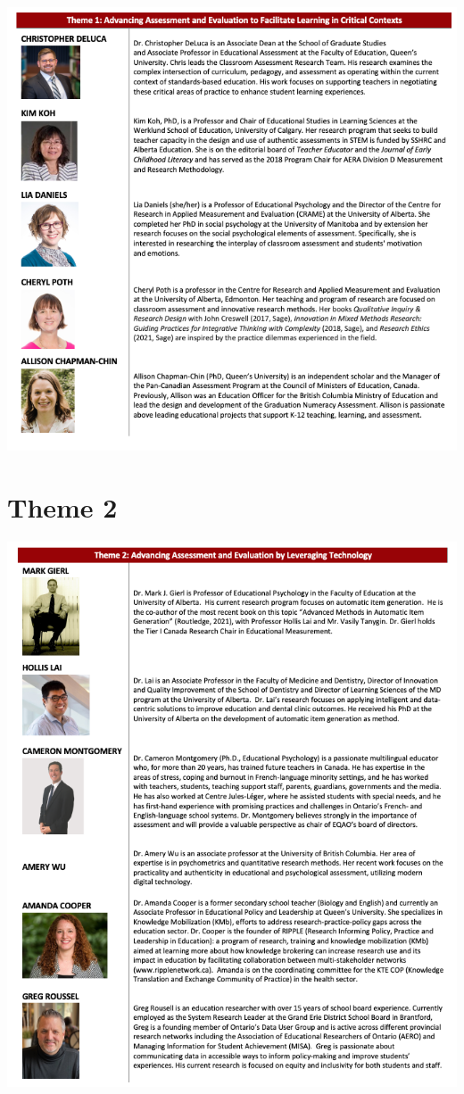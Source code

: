 \documentclass[
]{book}
\begin{document}
\includegraphics{Content/S1.png}

\newpage

\hypertarget{theme-2}{%
\section*{Theme 2}\label{theme-2}}

\includegraphics{Content/T2.png}
\end{document}
